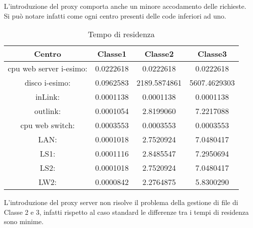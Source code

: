 L'introduzione del proxy comporta anche un minore accodamento delle richieste. Si può notare infatti come ogni centro presenti delle code inferiori ad uno.
\begin{table}[H]
\begin{center}
\begin{tabular}{||c|c|c|c||}
\hline
Centro &Classe1 &Classe2 &Classe3\\
\hline
\hline
 cpu web server i-esimo: 	&0.0222618	&0.0222618	&0.0222618	\\\hline
 disco i-esimo: 	&0.0962583	&2189.5874861	&5607.4629303	\\\hline
 inLink: 	&0.0001138	&0.0001138	&0.0001138	\\\hline
 outlink: 	&0.0001054	&2.8199060	&7.2217088	\\\hline
 cpu web switch: 	&0.0003553	&0.0003553	&0.0003553	\\\hline
 LAN: 	&0.0001018	&2.7520924	&7.0480417	\\\hline
 LS1: 	&0.0001116	&2.8485547	&7.2950694	\\\hline
 LS2: 	&0.0001018	&2.7520924	&7.0480417	\\\hline
 LW2: 	&0.0000842	&2.2764875	&5.8300290	\\\hline
\end{tabular}
\end{center}
\caption{Tempo di residenza}
\label{tempodiresidenza}
\end{table}
L'introduzione del proxy server non risolve il problema della gestione di file di Classe 2 e 3, infatti rispetto al caso standard le differenze tra i tempi di residenza sono minime.
